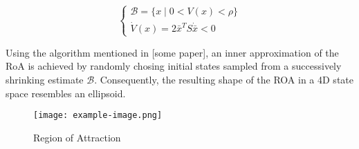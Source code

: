 \begin{equation}
\begin{cases}
    \mathcal{B} = \{ x \mid 0 < V(x) < \rho \} \\
    \dot{V}(x) = 2\bar{x}^T S \dot{\bar{x}} < 0
\end{cases}
\end{equation}

Using the algorithm mentioned in [some paper], an inner approximation of the RoA is achieved by randomly chosing initial states sampled from a successively shrinking estimate \(\mathcal{B}\). Consequently, the resulting shape of the ROA in a 4D state space resembles an ellipsoid.



\begin{figure}[htbp]
    \centering
    \texttt{[image: example-image.png]} %
    \caption{Region of Attraction}
    \label{fig:example}
\end{figure}

